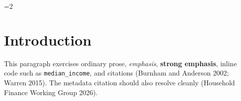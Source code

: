 \documentclass[12pt]{article}
\newif\ifdocdesignerdocdesigner
\newif\ifdocdesigneranon
\newcommand{\docdesignermaincolumns}{1}
\begin{document}
\begin{multicols}{2}
\setlength{\columnsep}{0.24in}
\raggedcolumns
\footnotesize
{}
\setlength{\parindent}{0.85em}
\setlength{\parskip}{0pt}
\titleformat{\section}{\normalsize\bfseries\color{docdesigneraccent}}{}{0pt}{}
\titleformat{\subsection}{\footnotesize\bfseries}{}{0pt}{}
\titlespacing{\section}{0pt}{0.5em}{0.14em}
\titlespacing{\subsection}{0pt}{0.38em}{0.1em}
\par\vspace{0.45em}
\else
\clearpage
\fi
\setcounter{page}{1}


\ifdocdesignerdocdesigner\else
\ifnum\docdesignermaincolumns=2\relax
  \twocolumn
\fi
\fi

\ifdocdesigneranon
\begingroup
\small
\noindent\textit{This manuscript is set to anonymous mode. Identifying metadata fields are suppressed on the title page.}\par
\endgroup
\vspace{1em}
\fi

\section{Introduction}\label{introduction}

This paragraph exercises ordinary prose, \emph{emphasis}, \textbf{strong
emphasis}, inline code such as \texttt{median\_income}, and citations
(Burnham and Anderson 2002; Warren 2015). The metadata citation should
also resolve cleanly (Household Finance Working Group 2026).


\end{multicols}
\end{document}
